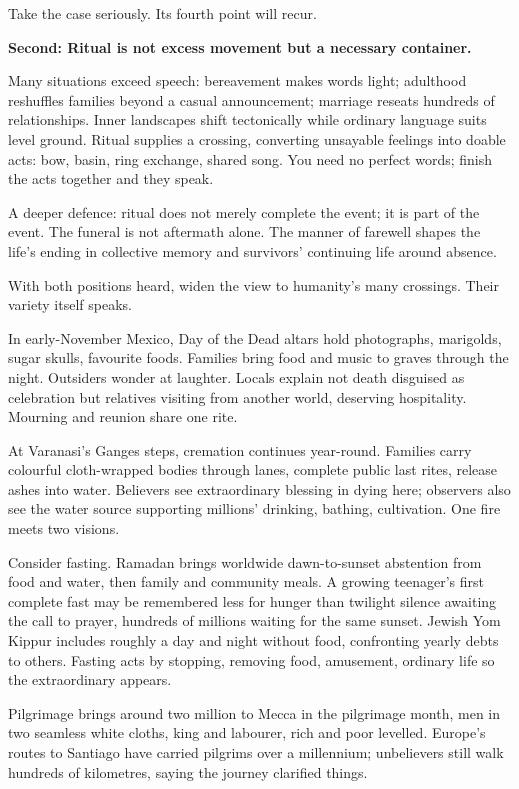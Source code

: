 Take the case seriously. Its fourth point will recur.

\textbf{Second: Ritual is not excess movement but a necessary container.}

Many situations exceed speech: bereavement makes words light; adulthood reshuffles families beyond a casual announcement; marriage reseats hundreds of relationships. Inner landscapes shift tectonically while ordinary language suits level ground. Ritual supplies a crossing, converting unsayable feelings into doable acts: bow, basin, ring exchange, shared song. You need no perfect words; finish the acts together and they speak.

A deeper defence: ritual does not merely complete the event; it is part of the event. The funeral is not aftermath alone. The manner of farewell shapes the life's ending in collective memory and survivors' continuing life around absence.

With both positions heard, widen the view to humanity's many crossings. Their variety itself speaks.

In early-November Mexico, Day of the Dead altars hold photographs, marigolds, sugar skulls, favourite foods. Families bring food and music to graves through the night. Outsiders wonder at laughter. Locals explain not death disguised as celebration but relatives visiting from another world, deserving hospitality. Mourning and reunion share one rite.

At Varanasi's Ganges steps, cremation continues year-round. Families carry colourful cloth-wrapped bodies through lanes, complete public last rites, release ashes into water. Believers see extraordinary blessing in dying here; observers also see the water source supporting millions' drinking, bathing, cultivation. One fire meets two visions.

Consider fasting. Ramadan brings worldwide dawn-to-sunset abstention from food and water, then family and community meals. A growing teenager's first complete fast may be remembered less for hunger than twilight silence awaiting the call to prayer, hundreds of millions waiting for the same sunset. Jewish Yom Kippur includes roughly a day and night without food, confronting yearly debts to others. Fasting acts by stopping, removing food, amusement, ordinary life so the extraordinary appears.

Pilgrimage brings around two million to Mecca in the pilgrimage month, men in two seamless white cloths, king and labourer, rich and poor levelled. Europe's routes to Santiago have carried pilgrims over a millennium; unbelievers still walk hundreds of kilometres, saying the journey clarified things.

